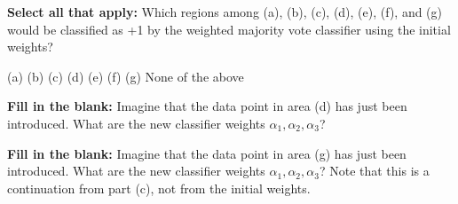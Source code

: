 \documentclass[11pt,addpoints,answers]{exam}
\begin{document}
\begin{questions}
\begin{parts}
\begin{center}
\end{center}
\begin{subparts}
\subpart[1] \textbf{Select all that apply:} Which regions among (a), (b), (c), (d), (e), (f), and (g) would be classified as +1 by the weighted majority vote classifier using the initial weights?

{%
    \checkboxchar{$\Box$} \checkedchar{$\blacksquare$} %
    \begin{checkboxes}
    \choice (a)
    \choice (b)
    \choice (c)
    \choice (d)
    \choice (e)
    \choice (f)
    \choice (g)
    \choice None of the above
    \end{checkboxes}
    }


\subpart[1] \textbf{Fill in the blank:} Imagine that the data point in area (d) has just been introduced. What are the new classifier weights $\alpha_1, \alpha_2, \alpha_3$?

\begin{your_solution}[title=$\alpha_1$,height=2cm, width=3cm]
\end{your_solution}
\begin{your_solution}[title=$\alpha_2$,height=2cm, width=3cm]
\end{your_solution}
\begin{your_solution}[title=$\alpha_3$,height=2cm, width=3cm]
\end{your_solution}

\newpage

\subpart[1] \textbf{Fill in the blank:} Imagine that the data point in area (g) has just been introduced. What are the new classifier weights $\alpha_1, \alpha_2, \alpha_3$? Note that this is a continuation from part (c), not from the initial weights.


\end{subparts}
\end{parts}
\end{questions}
\end{document}
